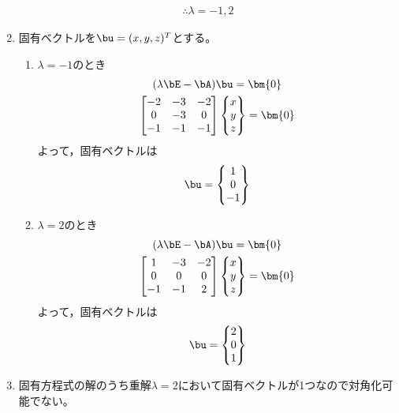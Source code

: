 \begin{ans*}
\begin{enumerate}[label=(\arabic*)]
    \begin{gather}
      \therefore \lambda = -1, 2 
    \end{gather}
    \item 固有ベクトルを$\bu = (x,y,z)^T$とする。
    \begin{enumerate}[label=(\roman*)]
      \item $\lambda = -1$のとき
      \begin{gather}
        (\lambda\bE - \bA)\bu = \bm{0} \\
        \begin{bmatrix}
          -2& -3& -2 \\
          0& -3& 0 \\
          -1& -1& -1 \\
        \end{bmatrix}
        \begin{Bmatrix}
          x \\ y \\ z
        \end{Bmatrix}
        =\bm{0} \\
      \end{gather}
      よって，固有ベクトルは
      \begin{gather}
        \bu =
        \begin{Bmatrix}
          1 \\ 0 \\ -1
        \end{Bmatrix}
      \end{gather}
      \item $\lambda = 2$のとき
      \begin{gather}
        (\lambda\bE - \bA)\bu = \bm{0} \\
        \begin{bmatrix}
          1& -3& -2 \\
          0& 0& 0 \\
          -1& -1& 2
        \end{bmatrix}
        \begin{Bmatrix}
          x \\ y \\ z
        \end{Bmatrix}
        =\bm{0} \\
      \end{gather}
      よって，固有ベクトルは
      \begin{gather}
        \bu =
        \begin{Bmatrix}
          2 \\ 0 \\ 1
        \end{Bmatrix}
      \end{gather}
    \end{enumerate}
    \item 固有方程式の解のうち重解$\lambda = 2$において固有ベクトルが1つなので対角化可能でない。
  \end{enumerate}
\end{ans*}
